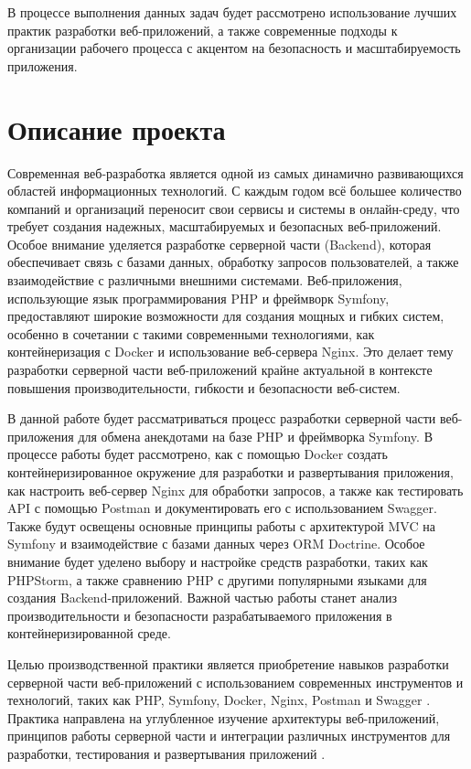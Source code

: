 \documentclass[pract]{SCWorks}
\begin{document}
В процессе выполнения данных задач будет рассмотрено использование
лучших практик разработки веб-приложений, а также современные подходы
к организации рабочего процесса с акцентом на безопасность и масштабируемость
приложения.

\section{Описание проекта}

Современная веб-разработка является одной из самых динамично развивающихся 
областей информационных технологий. С каждым годом всё большее количество
компаний и организаций переносит свои сервисы и системы в онлайн-среду,
что требует создания надежных, масштабируемых и безопасных веб-приложений.
Особое внимание уделяется разработке серверной части (Backend), 
которая обеспечивает связь с базами данных, обработку запросов 
пользователей, а также взаимодействие с различными внешними системами. 
Веб-приложения, использующие язык программирования PHP и фреймворк 
Symfony, предоставляют широкие возможности для создания мощных и гибких
систем, особенно в сочетании с такими современными технологиями, как 
контейнеризация с Docker и использование веб-сервера Nginx. Это делает 
тему разработки серверной части веб-приложений крайне актуальной в 
контексте повышения производительности, гибкости и безопасности
веб-систем.

В данной работе будет рассматриваться процесс разработки серверной
части веб-приложения для обмена анекдотами на базе PHP и фреймворка 
Symfony. В процессе работы будет рассмотрено, как с помощью Docker
создать контейнеризированное окружение для разработки и развертывания
приложения, как настроить веб-сервер Nginx для обработки запросов, а также
как тестировать API с помощью Postman и документировать его с использованием
Swagger. Также будут освещены основные принципы работы с архитектурой 
MVC на Symfony и взаимодействие с базами данных через ORM Doctrine. 
Особое внимание будет уделено выбору и настройке средств разработки, 
таких как PHPStorm, а также сравнению PHP с другими популярными языками 
для создания Backend-приложений. Важной частью работы станет анализ 
производительности и безопасности разрабатываемого приложения в
контейнеризированной среде.

Целью производственной практики является приобретение навыков разработки 
серверной части веб-приложений с использованием современных инструментов 
и технологий, таких как PHP, Symfony, Docker, Nginx, Postman и Swagger
\cite{symfony_docs} \cite{robots_net_symfony}. 
Практика направлена на углубленное изучение архитектуры веб-приложений, 
принципов работы серверной части и интеграции различных инструментов 
для разработки, тестирования и развертывания приложений 
\cite{postman_api_testing} \cite{postman_docs} \cite{nginx_docs}.
\end{document}
